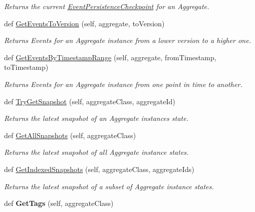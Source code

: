 \begin{DoxyCompactItemize}
\begin{DoxyCompactList}\small\item\em Returns the current \hyperlink{classChronos_1_1Infrastructure_1_1EventPersistenceCheckpoint}{Event\+Persistence\+Checkpoint} for an Aggregate. \end{DoxyCompactList}\item 
def \hyperlink{group__Chronos_ga33cde926e84482f515173ebec9852030}{Get\+Events\+To\+Version} (self, aggregate, to\+Version)
\begin{DoxyCompactList}\small\item\em Returns Events for an Aggregate instance from a lower version to a higher one. \end{DoxyCompactList}\item 
def \hyperlink{group__Chronos_gae9298fb619df87b9181b881acde8f013}{Get\+Events\+By\+Timestamp\+Range} (self, aggregate, from\+Timestamp, to\+Timestamp)
\begin{DoxyCompactList}\small\item\em Returns Events for an Aggregate instance from one point in time to another. \end{DoxyCompactList}\item 
def \hyperlink{group__Chronos_ga8a92959c83ea59013f94648eac6ec94b}{Try\+Get\+Snapshot} (self, aggregate\+Class, aggregate\+Id)
\begin{DoxyCompactList}\small\item\em Returns the latest snapshot of an Aggregate instance\textquotesingle{}s state. \end{DoxyCompactList}\item 
def \hyperlink{group__Chronos_ga8209810feeee912e6fe62f6244f38802}{Get\+All\+Snapshots} (self, aggregate\+Class)
\begin{DoxyCompactList}\small\item\em Returns the latest snapshot of all Aggregate instance states. \end{DoxyCompactList}\item 
def \hyperlink{group__Chronos_gabd09dd35ed768b611c4135612a878285}{Get\+Indexed\+Snapshots} (self, aggregate\+Class, aggregate\+Ids)
\begin{DoxyCompactList}\small\item\em Returns the latest snapshot of a subset of Aggregate instance states. \end{DoxyCompactList}\item 
def {\bfseries Get\+Tags} (self, aggregate\+Class)
\item 

\end{DoxyCompactItemize}
